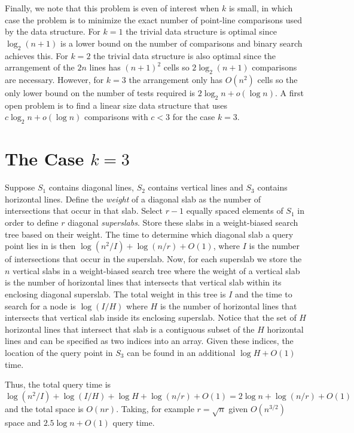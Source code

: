 \documentclass{article}
\begin{document}
Finally, we note that this problem is even of interest when $k$ is
small, in which case the problem is to minimize the exact number of
point-line comparisons used by the data structure.  For $k=1$ the
trivial data structure is optimal since $\log_2 (n+1)$ is a lower
bound on the number of comparisons and binary search achieves this.
For $k=2$ the trivial data structure is also optimal since the
arrangement of the $2n$ lines has $(n+1)^2$ cells so $2\log_2 (n+1)$
comparisons are necessary.  However, for $k=3$ the arrangement only
has $O(n^2)$ cells so the only lower bound on the number of tests
required is $2\log_2 n + o(\log n)$.  A first open problem is to find
a linear size data structure that uses $c\log_2 n + o(\log n)$
comparisons with $c<3$ for the case $k=3$. 

\section{The Case $k=3$}

Suppose $S_1$ contains diagonal lines, $S_2$ contains vertical lines
and $S_3$ contains horizontal lines. Define the \emph{weight} of a
diagonal slab as the number of intersections that occur in that slab.
Select $r-1$ equally spaced elements of $S_1$ in order to define $r$
diagonal \emph{superslabs}.  Store these slabs in a weight-biased
search tree based on their weight.  The time to determine which
diagonal slab a query point lies in is then $\log (n^2/I) + \log (n/r)
+ O(1)$, where $I$ is the number of intersections that occur in the
superslab.  Now, for each superslab we store the $n$ vertical slabs in
a weight-biased search tree where the weight of a vertical slab is the
number of horizontal lines that intersects that vertical slab within
its enclosing diagonal superslab.  The total weight in this tree is $I$ and the
time to search for a node is $\log (I/H)$ where $H$ is the number of
horizontal lines that intersects that vertical slab inside its
enclosing superslab. Notice that the set of $H$ horizontal lines that
intersect that slab is a contiguous subset of the $H$ horizontal lines
and can be specified as two indices into an array.  Given these
indices, the location of the query point in $S_3$ can be found in an
additional $\log H + O(1)$ time.

Thus, the total query time is $\log (n^2/I) + \log(I/H) + \log H +
\log (n/r)+O(1)= 2\log n+\log(n/r)+O(1)$ and the total space is
$O(nr)$.  Taking, for example $r=\sqrt{n}$ given $O(n^{3/2})$ space
and $2.5\log n + O(1)$ query time.




\end{document}
